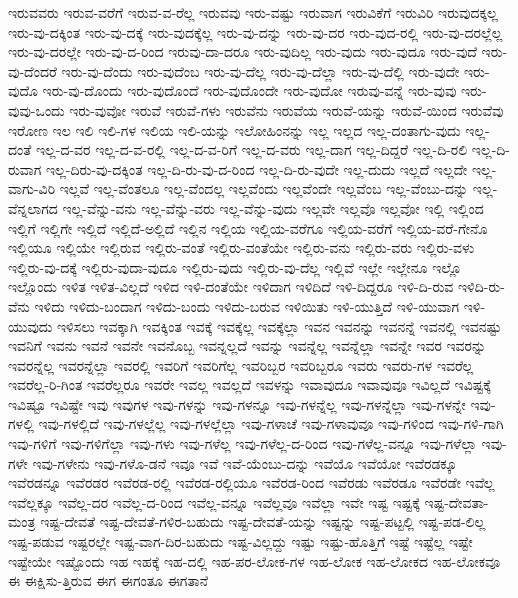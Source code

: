 {ಇರುವವರು
ಇರುವ-ವರೆಗೆ
ಇರುವ-ವ-ರೆಲ್ಲ
ಇರುವವು
ಇರು-ವಷ್ಟು
ಇರುವಾಗ
ಇರುವಿಕೆಗೆ
ಇರುವಿರಿ
ಇರುವುದಕ್ಕಲ್ಲ
ಇರು-ವು-ದಕ್ಕಿಂತ
ಇರು-ವು-ದಕ್ಕೆ
ಇರು-ವುದಕ್ಕೆಲ್ಲ
ಇರು-ವು-ದನ್ನು
ಇರು-ವು-ದರ
ಇರು-ವುದ-ರಲ್ಲಿ
ಇರು-ವು-ದರಲ್ಲೆಲ್ಲ
ಇರು-ವು-ದರಲ್ಲೇ
ಇರು-ವು-ದ-ರಿಂದ
ಇರುವು-ದಾ-ದರೂ
ಇರು-ವುದಿಲ್ಲ
ಇರು-ವುದು
ಇರು-ವುದೂ
ಇರು-ವುದೆ
ಇರು-ವು-ದೆಂದರೆ
ಇರು-ವು-ದೆಂದು
ಇರು-ವುದೆಂಬ
ಇರು-ವು-ದೆಲ್ಲ
ಇರು-ವು-ದೆಲ್ಲಾ
ಇರು-ವು-ದೆಲ್ಲಿ
ಇರು-ವುದೇ
ಇರು-ವುದೊ
ಇರು-ವು-ದೊಂದು
ಇರು-ವುದೊಂದೆ
ಇರು-ವುದೊಂದೇ
ಇರು-ವುದೋ
ಇರುವು-ವನ್ನೆ
ಇರು-ವುವು
ಇರು-ವುವು-ಒಂದು
ಇರು-ವುವೋ
ಇರುವೆ
ಇರುವೆ-ಗಳು
ಇರುವೆನು
ಇರುವೆಯ
ಇರುವೆ-ಯನ್ನು
ಇರುವೆ-ಯಿಂದ
ಇರುವೆವು
ಇರೋಣ
ಇಲ
ಇಲಿ
ಇಲಿ-ಗಳ
ಇಲಿಯ
ಇಲಿ-ಯನ್ನು
ಇಲೋಹಿಂನನ್ನು
ಇಲ್ಲ
ಇಲ್ಲದ
ಇಲ್ಲ-ದಂತಾಗು-ವುದು
ಇಲ್ಲ-ದಂತೆ
ಇಲ್ಲ-ದ-ವರ
ಇಲ್ಲ-ದ-ವ-ರಲ್ಲಿ
ಇಲ್ಲ-ದ-ವ-ರಿಗೆ
ಇಲ್ಲ-ದ-ವರು
ಇಲ್ಲ-ದಾಗ
ಇಲ್ಲ-ದಿದ್ದರೆ
ಇಲ್ಲ-ದಿ-ರಲಿ
ಇಲ್ಲ-ದಿ-ರುವಾಗ
ಇಲ್ಲ-ದಿರು-ವು-ದಕ್ಕಿಂತ
ಇಲ್ಲ-ದಿ-ರು-ವು-ದ-ರಿಂದ
ಇಲ್ಲ-ದಿ-ರು-ವುದೇ
ಇಲ್ಲ-ದುದು
ಇಲ್ಲದೆ
ಇಲ್ಲದೇ
ಇಲ್ಲ-ವಾಗು-ವಿರಿ
ಇಲ್ಲವೆ
ಇಲ್ಲ-ವೆಂತಲೂ
ಇಲ್ಲ-ವೆಂದಲ್ಲ
ಇಲ್ಲವೆಂದು
ಇಲ್ಲವೆಂದೇ
ಇಲ್ಲವೆಂಬ
ಇಲ್ಲ-ವೆಂಬು-ದನ್ನು
ಇಲ್ಲ-ವೆನ್ನಲಾಗದ
ಇಲ್ಲ-ವೆನ್ನು-ವನು
ಇಲ್ಲ-ವೆನ್ನು-ವರು
ಇಲ್ಲ-ವೆನ್ನು-ವುದು
ಇಲ್ಲವೇ
ಇಲ್ಲವೊ
ಇಲ್ಲವೋ
ಇಲ್ಲಿ
ಇಲ್ಲಿಂದ
ಇಲ್ಲಿಗೆ
ಇಲ್ಲಿಗೇ
ಇಲ್ಲಿದೆ
ಇಲ್ಲಿದೆ-ಅಲ್ಲಿದೆ
ಇಲ್ಲಿನ
ಇಲ್ಲಿಯ
ಇಲ್ಲಿಯ-ವರೆಗೂ
ಇಲ್ಲಿಯ-ವರೆಗೆ
ಇಲ್ಲಿಯ-ವರೆ-ಗೇನೊ
ಇಲ್ಲಿಯೂ
ಇಲ್ಲಿಯೇ
ಇಲ್ಲಿರುವ
ಇಲ್ಲಿರು-ವಂತೆ
ಇಲ್ಲಿರು-ವಂತೆಯೇ
ಇಲ್ಲಿರು-ವನು
ಇಲ್ಲಿರು-ವರು
ಇಲ್ಲಿರು-ವಳು
ಇಲ್ಲಿರು-ವು-ದಕ್ಕೆ
ಇಲ್ಲಿರು-ವುದಾ-ವುದೂ
ಇಲ್ಲಿರು-ವುದು
ಇಲ್ಲಿರು-ವು-ದೆಲ್ಲ
ಇಲ್ಲಿವೆ
ಇಲ್ಲೇ
ಇಲ್ಲೇನೂ
ಇಲ್ಲೊ
ಇಲ್ಲೊಂದು
ಇಳಿತ
ಇಳಿತ-ವಿಲ್ಲದೆ
ಇಳಿದ
ಇಳಿ-ದಂತೆಯೇ
ಇಳಿದಾಗ
ಇಳಿದಿದೆ
ಇಳಿ-ದಿದ್ದರೂ
ಇಳಿ-ದಿ-ರುವ
ಇಳಿದಿ-ರು-ವೆನು
ಇಳಿದು
ಇಳಿದು-ಬಂದಾಗ
ಇಳಿದು-ಬಂದು
ಇಳಿದು-ಬರುವ
ಇಳಿಯಿತು
ಇಳಿ-ಯುತ್ತಿದೆ
ಇಳಿ-ಯುವಾಗ
ಇಳಿ-ಯುವುದು
ಇಳಿಸಲು
ಇವಕ್ಕಾಗಿ
ಇವಕ್ಕಿಂತ
ಇವಕ್ಕೆ
ಇವಕ್ಕೆಲ್ಲ
ಇವಕ್ಕೆಲ್ಲಾ
ಇವನ
ಇವನನ್ನು
ಇವನನ್ನೆ
ಇವನಲ್ಲಿ
ಇವನಷ್ಟು
ಇವನಿಗೆ
ಇವನು
ಇವನೆ
ಇವನೇ
ಇವನೊಬ್ಬ
ಇವನ್ನಲ್ಲದೆ
ಇವನ್ನು
ಇವನ್ನೆಲ್ಲ
ಇವನ್ನೆಲ್ಲಾ
ಇವನ್ನೇ
ಇವರ
ಇವರನ್ನು
ಇವರನ್ನೆಲ್ಲ
ಇವರನ್ನೆಲ್ಲಾ
ಇವರಲ್ಲಿ
ಇವರಿಗೆ
ಇವರಿಗೆಲ್ಲ
ಇವರಿಬ್ಬರ
ಇವರಿಬ್ಬರೂ
ಇವರು
ಇವರು-ಗಳ
ಇವರೆಲ್ಲ
ಇವರೆಲ್ಲ-ರಿ-ಗಿಂತ
ಇವರೆಲ್ಲರೂ
ಇವರೇ
ಇವಲ್ಲ
ಇವಲ್ಲದೆ
ಇವಳನ್ನು
ಇವಾವುದೂ
ಇವಾವುವೂ
ಇವಿಲ್ಲದೆ
ಇವಿಷ್ಟಕ್ಕೆ
ಇವಿಷ್ಟೂ
ಇವಿಷ್ಟೇ
ಇವು
ಇವುಗಳ
ಇವು-ಗಳನ್ನು
ಇವು-ಗಳನ್ನೂ
ಇವು-ಗಳನ್ನೆಲ್ಲ
ಇವು-ಗಳನ್ನೆಲ್ಲಾ
ಇವು-ಗಳನ್ನೇ
ಇವು-ಗಳಲ್ಲಿ
ಇವು-ಗಳಲ್ಲಿದೆ
ಇವು-ಗಳಲ್ಲೆಲ್ಲ
ಇವು-ಗಳಲ್ಲೆಲ್ಲಾ
ಇವು-ಗಳಾಚೆ
ಇವು-ಗಳಾವುವೂ
ಇವು-ಗಳಿಂದ
ಇವು-ಗಳಿ-ಗಾಗಿ
ಇವು-ಗಳಿಗೆ
ಇವು-ಗಳಿಗೆಲ್ಲಾ
ಇವು-ಗಳು
ಇವು-ಗಳೆಲ್ಲ
ಇವು-ಗಳೆಲ್ಲ-ದ-ರಿಂದ
ಇವು-ಗಳೆಲ್ಲ-ವನ್ನೂ
ಇವು-ಗಳೆಲ್ಲಾ
ಇವು-ಗಳೇ
ಇವು-ಗಳೇನು
ಇವು-ಗಳೊ-ಡನೆ
ಇವೂ
ಇವೆ
ಇವೆ-ಯೆಂಬು-ದನ್ನು
ಇವೆಯೊ
ಇವೆಯೋ
ಇವೆರಡಕ್ಕೂ
ಇವೆರಡನ್ನೂ
ಇವೆರಡರ
ಇವೆರಡ-ರಲ್ಲಿ
ಇವೆರಡ-ರಲ್ಲಿಯೂ
ಇವೆರಡ-ರಿಂದ
ಇವೆರಡು
ಇವೆರಡೂ
ಇವೆರಡೇ
ಇವೆಲ್ಲ
ಇವೆಲ್ಲಕ್ಕೂ
ಇವೆಲ್ಲ-ದರ
ಇವೆಲ್ಲ-ದ-ರಿಂದ
ಇವೆಲ್ಲ-ವನ್ನೂ
ಇವೆಲ್ಲವೂ
ಇವೆಲ್ಲಾ
ಇವೇ
ಇಷ್ಟ
ಇಷ್ಟಕ್ಕೆ
ಇಷ್ಟ-ದೇವತಾ-ಮಂತ್ರ
ಇಷ್ಟ-ದೇವತೆ
ಇಷ್ಟ-ದೇವತೆ-ಗಳಿರ-ಬಹುದು
ಇಷ್ಟ-ದೇವತೆ-ಯನ್ನು
ಇಷ್ಟನ್ನು
ಇಷ್ಟ-ಪಟ್ಟಲ್ಲಿ
ಇಷ್ಟ-ಪಡ-ಲಿಲ್ಲ
ಇಷ್ಟ-ಪಡುವ
ಇಷ್ಟರಲ್ಲೇ
ಇಷ್ಟ-ವಾಗ-ದಿರ-ಬಹುದು
ಇಷ್ಟ-ವಿಲ್ಲದ್ದು
ಇಷ್ಟು
ಇಷ್ಟು-ಹೊತ್ತಿಗೆ
ಇಷ್ಟೆ
ಇಷ್ಟೆಲ್ಲ
ಇಷ್ಟೇ
ಇಷ್ಟೇಯೇ
ಇಷ್ಟೊಂದು
ಇಹ
ಇಹಕ್ಕೆ
ಇಹ-ದಲ್ಲಿ
ಇಹ-ಪರ-ಲೋಕ-ಗಳ
ಇಹ-ಲೋಕ
ಇಹ-ಲೋಕದ
ಇಹ-ಲೋಕವೂ
ಈ
ಈಕ್ಷಿಸು-ತ್ತಿರುವ
ಈಗ
ಈಗಂತೂ
ಈಗತಾನೆ
}
